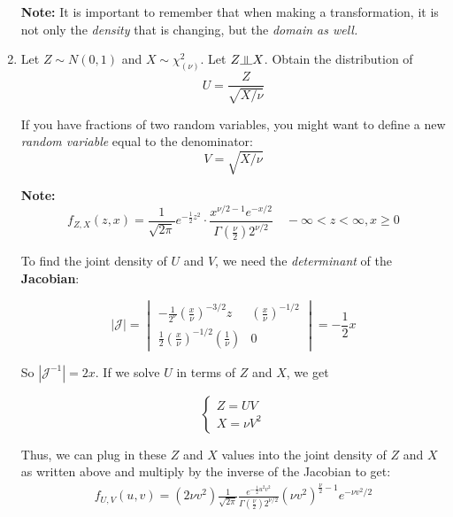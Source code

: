 \documentclass{article}
\newcommand{\indep}{\rotatebox[origin=c]{90}{$\models$}}
\begin{document}
\begin{enumerate}
    \textbf{Note:} It is important to remember that when making a transformation, it is not only the \textit{density} that is changing, but the \textit{domain as well.}
    
    \item Let $Z \sim N(0,1)$ and $X \sim \chi_{(\nu)}^2$. Let $Z \indep X$. Obtain the distribution of
    \begin{equation*}
        U = \frac{Z}{\sqrt{X/\nu}}
    \end{equation*}
    
    If you have fractions of two random variables, you might want to define a new \textit{random variable} equal to the denominator:
    \begin{equation*}
        V = \sqrt{X/\nu}
    \end{equation*}
    
    \textbf{Note:}
    \begin{equation*}
        f_{Z,X} (z,x) = \frac{1}{\sqrt{2\pi}}e^{-\frac{1}{2}z^2} \cdot \frac{x^{\nu/2-1}e^{-x/2}}{\Gamma\left(\frac{\nu}{2}\right) 2^{\nu/2}} \quad -\infty < z < \infty, x \geq 0
    \end{equation*}
    
    To find the joint density of $U$ and $V$, we need the \textit{determinant} of the \textbf{Jacobian}:
    
    \begin{equation*}
        |\mathcal{J}| = \begin{vmatrix}
            - \frac{1}{2^\nu} \left(\frac{x}{\nu}\right)^{-3/2}z & \left(\frac{x}{\nu}\right)^{-1/2}\\
            \frac{1}{2}\left(\frac{x}{\nu}\right)^{-1/2} \left(\frac{1}{\nu}\right) & 0
        \end{vmatrix} = - \frac{1}{2}x
    \end{equation*}
    
    So $|\mathcal{J}^{-1}| = 2x$. If we solve $U$ in terms of $Z$ and $X$, we get
    
    \begin{equation*}
        \begin{cases}
            Z = UV \\
            X = \nu V^2
        \end{cases}
    \end{equation*}
    
    Thus, we can plug in these $Z$ and $X$ values into the joint density of $Z$ and $X$ as written above and multiply by the inverse of the Jacobian to get:
    \begin{equation*}
        \begin{split}
            f_{U,V}(u,v) = (2 \nu v^2) \frac{1}{\sqrt{2\pi}} \frac{e^{-\frac{1}{2}u^2 v^2}}{\Gamma\left(\frac{\nu}{2}\right) 2^{\nu/2}} (\nu v^2)^{\frac{\nu}{2}-1}e^{-\nu v^2/2}
        \end{split}
    \end{equation*}
    

\end{enumerate}
\end{document}
